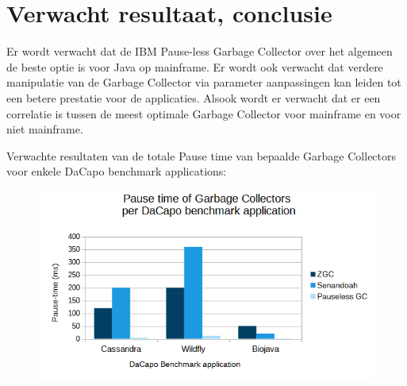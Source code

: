 


\section{Verwacht resultaat, conclusie}%
\label{sec:verwachte_resultaten}

Er wordt verwacht dat de IBM Pause-less Garbage Collector over het algemeen de beste optie is voor Java op mainframe.
Er wordt ook verwacht dat verdere manipulatie van de Garbage Collector via parameter aanpassingen kan leiden tot een betere prestatie voor de applicaties.
Alsook wordt er verwacht dat er een correlatie is tussen de meest optimale Garbage Collector voor mainframe en voor niet mainframe.

\vspace{\baselineskip}

\begin{graph1section}
    Verwachte resultaten van de totale Pause time van bepaalde Garbage Collectors voor enkele DaCapo benchmark applications:
    \begin{figure}[h]
        \centering
        \includegraphics[width=1\columnwidth]{img/graph2.png}
    \end{figure}
\end{graph1section}

